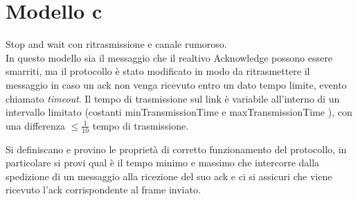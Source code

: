 \documentclass[a4paper]{article}
\begin{document}
\section{Modello c}
Stop and wait con ritrasmissione e canale rumoroso.\\
In questo modello sia il messaggio che il realtivo Acknowledge possono essere smarriti, ma il protocollo è stato modificato in modo da ritrasmettere il messaggio in caso un ack non venga ricevuto entro un dato tempo limite, evento chiamato \textit{timeout}.
Il tempo di trasmissione sul link è variabile all’interno di un intervallo limitato (costanti minTransmissionTime e maxTransmissionTime ), con una differenza $\leq \frac{1}{10}$ tempo di trasmissione.

Si definiscano e provino le proprietà di corretto funzionamento del protocollo, in particolare si provi qual è il tempo minimo e massimo che intercorre dalla spedizione di un messaggio alla ricezione del suo ack e ci si assicuri che viene ricevuto l'ack corrispondente al frame inviato.
\end{document}
